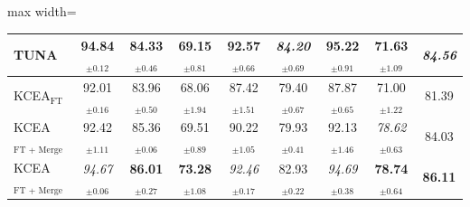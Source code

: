 \begin{table}[!t]
\begin{subtable}{\textwidth}
\begin{adjustbox}{max width=\textwidth}
\begin{tabular}{l c c c c c c c c}
TUNA & \textbf{94.84}$_{\pm 0.12}$ & 84.33$_{\pm 0.46}$ & 69.15$_{\pm 0.81}$ & \textbf{92.57}$_{\pm 0.66}$ & \textit{84.20}$_{\pm 0.69}$ & \textbf{95.22}$_{\pm 0.91}$ & 71.63$_{\pm 1.09}$ & \textit{84.56} \\
\midrule
KCEA$_{\text{FT}}$ & 92.01$_{\pm 0.16}$ & 83.96$_{\pm 0.50}$ & 68.06$_{\pm 1.94}$ & 87.42$_{\pm 1.51}$ & 79.40$_{\pm 0.67}$ & 87.87$_{\pm 0.65}$ & 71.00$_{\pm 1.22}$ & 81.39 \\
KCEA$_{\text{FT + Merge}}$ & 92.42$_{\pm 1.11}$ & 85.36$_{\pm 0.06}$ & 69.51$_{\pm 0.89}$ & 90.22$_{\pm 1.05}$ & 79.93$_{\pm 0.41}$ & 92.13$_{\pm 1.46}$ & \textit{78.62}$_{\pm 0.63}$ & 84.03 \\
KCEA$_{\text{FT + Merge + Align}}$ & \textit{94.67}$_{\pm 0.06}$ & \textbf{86.01}$_{\pm 0.27}$ & \textbf{73.28}$_{\pm 1.08}$ & \textit{92.46}$_{\pm 0.17}$ & 82.93$_{\pm 0.22}$ & \textit{94.69}$_{\pm 0.38}$ & \textbf{78.74}$_{\pm 0.64}$ & \textbf{86.11} \\
\bottomrule
\end{tabular}
\end{adjustbox}
\end{subtable}

\vspace{0.6em}


\end{table}
